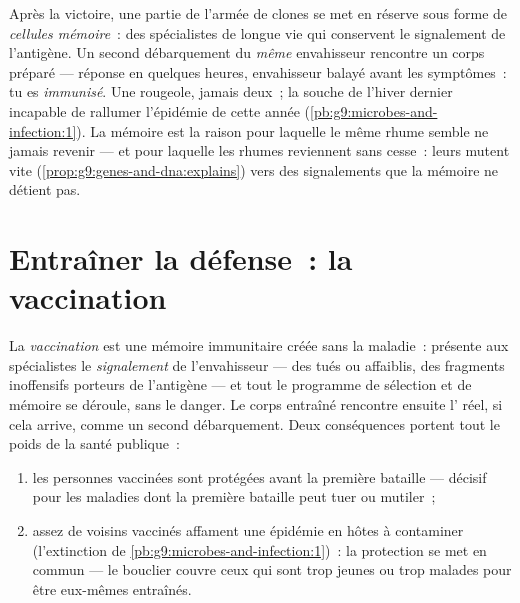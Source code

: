 \begin{definition}\label{def:g9:immune-defenses:memory}
Après la victoire, une partie de l'armée de clones se met en
réserve sous forme de \emph{cellules
mémoire}~: des spécialistes de longue
vie qui conservent le signalement de l'antigène. Un second
débarquement du \emph{même} envahisseur rencontre un corps
préparé --- réponse en quelques heures, envahisseur balayé
avant les symptômes~: tu es \emph{immunisé}.
Une rougeole, jamais deux~; la souche de l'hiver dernier
incapable de rallumer l'épidémie de cette année
(\cref{pb:g9:microbes-and-infection:1}). La mémoire est la
raison pour laquelle le même rhume semble ne jamais revenir
--- et pour laquelle les rhumes reviennent sans cesse~:
leurs  mutent vite
(\cref{prop:g9:genes-and-dna:explains}) vers des
signalements que la mémoire ne détient pas.
\end{definition}

\section{Entraîner la défense~: la vaccination}

\begin{proposition}[La vaccination]\label{prop:g9:immune-defenses:vaccination}
La \emph{vaccination} est une mémoire
immunitaire créée sans la maladie~: présente aux
spécialistes le \emph{signalement} de l'envahisseur --- des
 tués ou affaiblis, des fragments inoffensifs
porteurs de l'antigène --- et tout le programme de sélection
et de mémoire se déroule, sans le danger. Le corps entraîné
rencontre ensuite l' réel, si cela arrive,
comme un second débarquement. Deux conséquences portent tout
le poids de la santé publique~:
\begin{enumerate}
  \item les personnes vaccinées sont protégées avant la
        première bataille --- décisif pour les maladies dont
        la première bataille peut tuer ou mutiler~;
  \item assez de voisins vaccinés affament une épidémie en
        hôtes à contaminer (l'extinction de
        \cref{pb:g9:microbes-and-infection:1})~: la
        protection se met en commun --- le bouclier couvre
        ceux qui sont trop jeunes ou trop malades pour être
        eux-mêmes entraînés.
\end{enumerate}
\end{proposition}
\admitted

